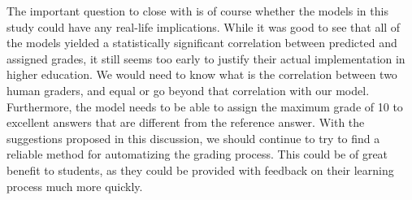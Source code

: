 \documentclass[a4paper,10pt,twoside]{article}
\begin{document}
The important question to close with is of course whether the models in this study could have any real-life implications. While it was good to see that all of the models yielded a statistically significant correlation between predicted and assigned grades, it still seems too early to justify their actual implementation in higher education. We would need to know what is the correlation between two human graders, and equal or go beyond that correlation with our model. Furthermore, the model needs to be able to assign the maximum grade of 10 to excellent answers that are different from the reference answer. With the suggestions proposed in this discussion, we should continue to try to find a reliable method for automatizing the grading process. This could be of great benefit to students, as they could be provided with feedback on their learning process much more quickly.





 
 
\end{document}
